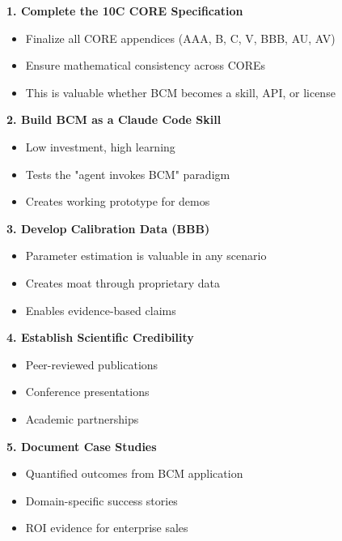 \begin{tcolorbox}[colback=green!5!white, colframe=green!75!black,
    title=No-Regret Moves (Valid Across All Scenarios)]

\textbf{1. Complete the 10C CORE Specification}
\begin{itemize}[nosep]
\item Finalize all CORE appendices (AAA, B, C, V, BBB, AU, AV)
\item Ensure mathematical consistency across COREs
\item This is valuable whether BCM becomes a skill, API, or license
\end{itemize}

\textbf{2. Build BCM as a Claude Code Skill}
\begin{itemize}[nosep]
\item Low investment, high learning
\item Tests the "agent invokes BCM" paradigm
\item Creates working prototype for demos
\end{itemize}

\textbf{3. Develop Calibration Data (BBB)}
\begin{itemize}[nosep]
\item Parameter estimation is valuable in any scenario
\item Creates moat through proprietary data
\item Enables evidence-based claims
\end{itemize}

\textbf{4. Establish Scientific Credibility}
\begin{itemize}[nosep]
\item Peer-reviewed publications
\item Conference presentations
\item Academic partnerships
\end{itemize}

\textbf{5. Document Case Studies}
\begin{itemize}[nosep]
\item Quantified outcomes from BCM application
\item Domain-specific success stories
\item ROI evidence for enterprise sales
\end{itemize}

\end{tcolorbox}


